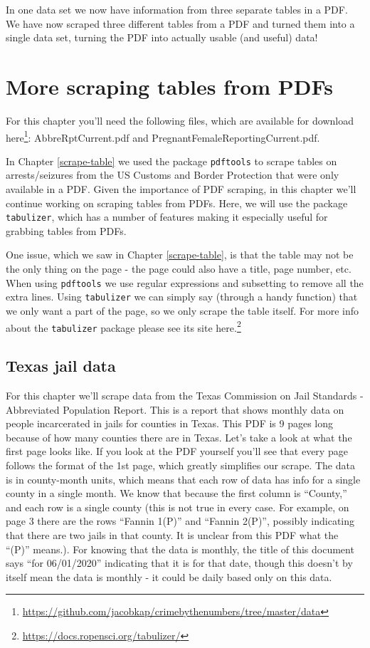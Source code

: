 \documentclass[
]{krantz}
\renewcommand{\href}[2]{#2\footnote{\url{#1}}}
\begin{document}
In one data set we now have information from three separate
tables in a PDF. We have now scraped three different tables
from a PDF and turned them into a single data set, turning
the PDF into actually usable (and useful) data!

\hypertarget{scrape-table2}{%
\chapter{More scraping tables from
PDFs}\label{scrape-table2}}

For this chapter you'll need the following files, which are
available for download
\href{https://github.com/jacobkap/crimebythenumbers/tree/master/data}{here}:
AbbreRptCurrent.pdf and PregnantFemaleReportingCurrent.pdf.

In Chapter \ref{scrape-table} we used the package
\texttt{pdftools} to scrape tables on arrests/seizures from
the US Customs and Border Protection that were only
available in a PDF. Given the importance of PDF scraping, in
this chapter we'll continue working on scraping tables from
PDFs. Here, we will use the package \texttt{tabulizer},
which has a number of features making it especially useful
for grabbing tables from PDFs.

One issue, which we saw in Chapter \ref{scrape-table}, is
that the table may not be the only thing on the page - the
page could also have a title, page number, etc. When using
\texttt{pdftools} we use regular expressions and subsetting
to remove all the extra lines. Using \texttt{tabulizer} we
can simply say (through a handy function) that we only want
a part of the page, so we only scrape the table itself. For
more info about the \texttt{tabulizer} package please see
its site \href{https://docs.ropensci.org/tabulizer/}{here.}

\hypertarget{texas-jail-data}{%
\section{Texas jail data}\label{texas-jail-data}}

For this chapter we'll scrape data from the Texas Commission
on Jail Standards - Abbreviated Population Report. This is a
report that shows monthly data on people incarcerated in
jails for counties in Texas. This PDF is 9 pages long
because of how many counties there are in Texas. Let's take
a look at what the first page looks like. If you look at the
PDF yourself you'll see that every page follows the format
of the 1st page, which greatly simplifies our scrape. The
data is in county-month units, which means that each row of
data has info for a single county in a single month. We know
that because the first column is ``County,'' and each row is
a single county (this is not true in every case. For
example, on page 3 there are the rows ``Fannin 1(P)'' and
``Fannin 2(P)'', possibly indicating that there are two
jails in that county. It is unclear from this PDF what the
``(P)'' means.). For knowing that the data is monthly, the
title of this document says ``for 06/01/2020'' indicating
that it is for that date, though this doesn't by itself mean
the data is monthly - it could be daily based only on this
data.
\end{document}
